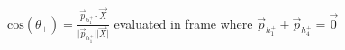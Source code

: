 \documentclass[border={2pt 1pt 2pt 1pt}]{standalone}
\begin{document}
$\mathrm{cos}(\theta_+) = \frac{\vec{p}_{h_1^+}\cdot\vec{X}}{\lvert\vec{p}_{h_1^+}\rvert\lvert\vec{X}\rvert}$ \quad
evaluated in frame where $\vec{p}_{h_1^+} + \vec{p}_{h_4^+} = \vec{0}$
\end{document}
